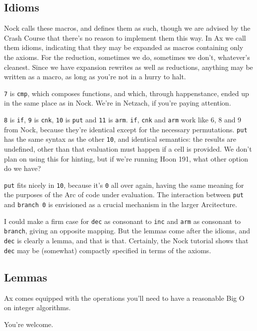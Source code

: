 \documentclass[twoside]{article}
\begin{document}
\subsection{Idioms}

Nock calls these macros, and defines them as such, though we are advised by the Crash Course that there's no reason to implement them this way. In Ax we call them idioms, indicating that they may be expanded as macros containing only the axioms. For the reduction, sometimes we do, sometimes we don't, whatever's cleanest. Since we have expansion rewrites as well as reductions, anything may be written as a macro, as long as you're not in a hurry to halt. 

\texttt{7} is \texttt{cmp}, which composes functions, and which, through happenstance, ended up in the same place as in Nock. We're in Netzach, if you're paying attention.

\texttt{8} is \texttt{if}, \texttt{9} is \texttt{cnk}, \texttt{10} is \texttt{put} and \texttt{11} is \texttt{arm}. \texttt{if}, \texttt{cnk} and \texttt{arm} work like 6, 8 and 9 from Nock, because they're identical except for the necessary permutations. \texttt{put} has the same syntax as the other \texttt{10}, and identical semantics: the results are undefined, other than that evaluation must happen if a cell is provided. We don't plan on using this for hinting, but if we're running Hoon 191, what other option do we have? 

\texttt{put} fits nicely in \texttt{10}, because it's \texttt{0} all over again, having the same meaning for the purposes of the Arc of code under evaluation. The interaction between \texttt{put} and \texttt{branch 0} is envisioned as a crucial mechanism in the larger Arcitecture. 

I could make a firm case for \texttt{dec} as consonant to \texttt{inc} and \texttt{arm} as consonant to \texttt{branch}, giving an opposite mapping. But the lemmas come after the idioms, and \texttt{dec} is clearly a lemma, and that is that. Certainly, the Nock tutorial shows that \texttt{dec} may be (somewhat) compactly specified in terms of the axioms.

\subsection{Lemmas}

Ax comes equipped with the operations you'll need to have a reasonable Big O on integer algorithms.

You're welcome.
\end{document}
